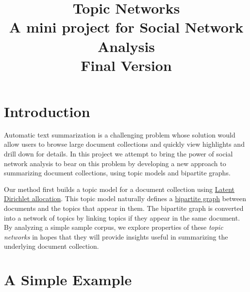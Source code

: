 \documentclass[%
	final,
	notitlepage,
	narroweqnarray,
	inline,
	]{ieee}
\begin{document}
\nocite{big}
\nocite{Sh:1}
\nocite{small} 

\title[Topic Networks]{
       Topic Networks \\
       {\Large A mini project for Social Network Analysis} \\
       {\large Final Version}
}



\maketitle               
\section{Introduction}

\PARstart Automatic text summarization is a challenging problem whose solution 
would allow users to browse large document collections and quickly view highlights 
and drill down for details.  
In this project we attempt to bring the power of social network analysis to bear on
this problem by developing 
a new approach to summarizing document collections, using topic models and bipartite 
graphs. 

Our method first builds a topic model for a document collection using 
\href{http://en.wikipedia.org/wiki/Latent_Dirichlet_allocation}{Latent Dirichlet allocation}\cite{lda}.
This topic model naturally defines a \href{http://en.wikipedia.org/wiki/Bipartite_graph}{bipartite graph}\cite{bipartite} 
between documents and the topics that appear in 
them.  The bipartite graph is converted into a network of topics by linking
topics if they appear in the same document.  By analyzing a simple sample corpus, we explore 
properties of these {\em topic networks} in hopes that they will
provide insights useful in summarizing the
underlying document collection.


\section{A Simple Example}
\end{document}
